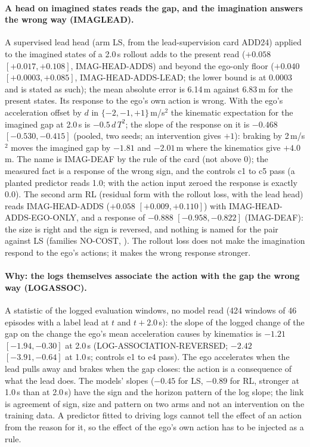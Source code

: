 \paragraph{A head on imagined states reads the gap, and the imagination answers the wrong way (IMAGLEAD).} A supervised lead head (arm LS, from the lead-supervision card ADD24) applied to the imagined states of a 2.0\,s rollout adds to the present read ($+0.058$ $[+0.017,+0.108]$, IMAG-HEAD-ADDS) and beyond the ego-only floor ($+0.040$ $[+0.0003,+0.085]$, IMAG-HEAD-ADDS-LEAD; the lower bound is at 0.0003 and is stated as such); the mean absolute error is 6.14\,m against 6.83\,m for the present states. Its response to the ego's own action is wrong. With the ego's acceleration offset by $d$ in $\{-2,-1,+1\}$\,m/s$^2$ the kinematic expectation for the imagined gap at 2.0\,s is $-0.5\,d\,T^2$; the slope of the response on it is $-0.468$ $[-0.530,-0.415]$ (pooled, two seeds; an intervention gives $+1$): braking by 2\,m/s$^2$ moves the imagined gap by $-1.81$ and $-2.01$\,m where the kinematics give $+4.0$\,m. The name is IMAG-DEAF by the rule of the card (not above 0); the measured fact is a response of the wrong sign, and the controls c1 to c5 pass (a planted predictor reads 1.0; with the action input zeroed the response is exactly 0.0). The second arm RL (residual form with the rollout loss, with the lead head) reads IMAG-HEAD-ADDS ($+0.058$ $[+0.009,+0.110]$) with IMAG-HEAD-ADDS-EGO-ONLY, and a response of $-0.888$ $[-0.958,-0.822]$ (IMAG-DEAF): the size is right and the sign is reversed, and nothing is named for the pair against LS (families NO-COST, ). The rollout loss does not make the imagination respond to the ego's actions; it makes the wrong response stronger.

\paragraph{Why: the logs themselves associate the action with the gap the wrong way (LOGASSOC).} A statistic of the logged evaluation windows, no model read (424 windows of 46 episodes with a label lead at $t$ and $t+2.0$\,s): the slope of the logged change of the gap on the change the ego's mean acceleration causes by kinematics is $-1.21$ $[-1.94,-0.30]$ at 2.0\,s (LOG-ASSOCIATION-REVERSED; $-2.42$ $[-3.91,-0.64]$ at 1.0\,s; controls e1 to e4 pass). The ego accelerates when the lead pulls away and brakes when the gap closes: the action is a consequence of what the lead does. The models' slopes ($-0.45$ for LS, $-0.89$ for RL, stronger at 1.0\,s than at 2.0\,s) have the sign and the horizon pattern of the log slope; the link is agreement of sign, size and pattern on two arms and not an intervention on the training data. A predictor fitted to driving logs cannot tell the effect of an action from the reason for it, so the effect of the ego's own action has to be injected as a rule.

